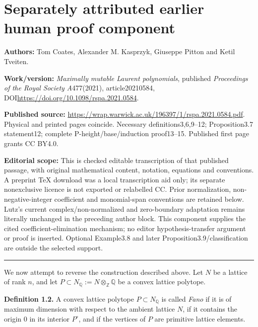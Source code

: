\documentclass[11pt]{article}
\numberwithin{equation}{section}
\begin{document}
\section*{Separately attributed earlier human proof component}
\noindent\textbf{Authors:} Tom Coates, Alexander M. Kasprzyk, Giuseppe Pitton and Ketil Tveiten.\par
\noindent\textbf{Work/version:} \emph{Maximally mutable Laurent polynomials}, published \emph{Proceedings of the Royal Society A}477(2021), article20210584, DOI\url{https://doi.org/10.1098/rspa.2021.0584}.\par
\noindent\textbf{Published source:} \url{https://wrap.warwick.ac.uk/196397/1/rspa.2021.0584.pdf}. Physical and printed pages coincide. Necessary definitions3,6,9--12; Proposition3.7 statement12; complete P-height/base/induction proof13--15. Published first page grants CC BY4.0.\par
\noindent\textbf{Editorial scope:} This is checked editable transcription of that published passage, with original mathematical content, notation, equations and conventions. A preprint TeX download was a local transcription aid only; its separate nonexclusive licence is not exported or relabelled CC. Prior normalization, non-negative-integer coefficient and monomial-span conventions are retained below. Lutz's current complex/non-normalized and zero-boundary adaptation remains literally unchanged in the preceding author block. This component supplies the cited coefficient-elimination mechanism; no editor hypothesis-transfer argument or proof is inserted. Optional Example3.8 and later Proposition3.9/classification are outside the selected support.\par
\medskip\hrule\medskip
\setcounter{equation}{0}
\renewcommand{\theequation}{3.\arabic{equation}}

We now attempt to reverse the construction described above. Let $N$ be a lattice of rank $n$, and let $P\subset{N_{\mathbb{Q}}}:=N\otimes_\mathbb{Z}\mathbb{Q}$ be a convex lattice polytope.
\par\noindent\textbf{Definition 1.2.} 
A convex lattice polytope $P\subset{N_{\mathbb{Q}}}$ is called \emph{Fano} if it is of maximum dimension with respect to the ambient lattice $N$, if it contains the origin $0$ in its interior ${P}^{\circ}$, and if the vertices of $P$ are primitive lattice elements. 

\par
\end{document}
